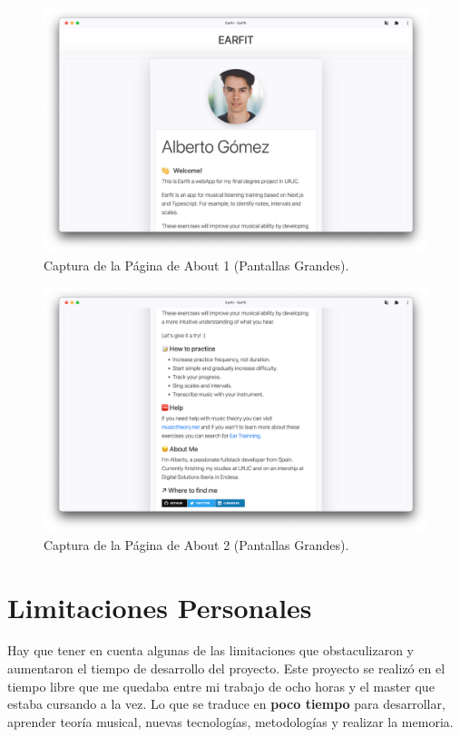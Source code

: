 \documentclass[12pt,twoside,titlepage]{report}
\begin{document}
{\begin{figure}[H]
    \centering
    \includegraphics[scale=0.28]{Capturas Earfit/PC/About1}
    \caption{Captura de la Página de About 1 (Pantallas Grandes).}
    \label{fig:PCAbout1}
\end{figure}

\begin{figure}[H]
    \centering
    \includegraphics[scale=0.28]{Capturas Earfit/PC/About2}
    \caption{Captura de la Página de About 2 (Pantallas Grandes).}
    \label{fig:PCAbout2}
\end{figure}


\chapter{Limitaciones Personales}

Hay que tener en cuenta algunas de las limitaciones que obstaculizaron y aumentaron el tiempo de desarrollo del proyecto. Este proyecto se realizó en el tiempo libre que me quedaba entre mi trabajo de ocho horas y el master que estaba cursando a la vez. Lo que se traduce en \textbf{poco tiempo} para desarrollar, aprender teoría musical, nuevas tecnologías, metodologías y realizar la memoria. 

}
\end{document}
